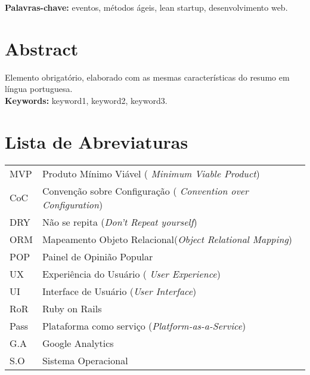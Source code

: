 \documentclass[12pt,twoside,a4paper]{book}
\begin{document}
\noindent \textbf{Palavras-chave:} eventos, métodos ágeis, lean startup, desenvolvimento web.

\chapter*{Abstract}

Elemento obrigatório, elaborado com as mesmas características do resumo em
língua portuguesa.
\\

\noindent \textbf{Keywords:} keyword1, keyword2, keyword3.


\tableofcontents    %




\chapter{Lista de Abreviaturas}
\begin{tabular}{ll}
            MVP         &  Produto Mínimo Viável (\emph{ Minimum Viable Product})\\
            CoC         &  Convenção sobre Configuração (\emph{ Convention over Configuration}) \\
            DRY         &  Não se repita (\emph{Don't Repeat yourself})\\
            ORM         &  Mapeamento Objeto Relacional(\emph{Object Relational Mapping})\\
            POP         &  Painel de Opinião Popular\\
            UX          &  Experiência do Usuário ( \emph{User Experience})\\
            UI          &  Interface de Usuário (\emph{User Interface})\\
            RoR         &  Ruby on Rails\\
            Pass        &  Plataforma como serviço (\emph{Platform-as-a-Service})\\
            G.A			& Google Analytics \\
            S.O			& Sistema Operacional \\
\end{tabular}
\end{document}
